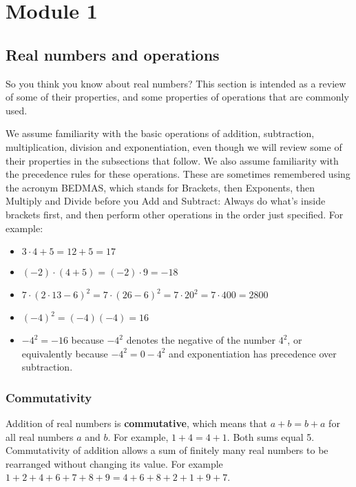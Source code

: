 \documentclass[11pt]{book}               %
\begin{document}
\setcounter{section}{0}

\setcounter{tocdepth}{1}

\tableofcontents
\newpage

\chapter{Module 1}

\section{Real numbers and operations}


So you think you know about real numbers?  This section is intended as a review of some of their properties, and
some properties of operations that are commonly used.

We assume familiarity with the basic operations of addition, subtraction, multiplication, division and exponentiation,
even though we will review some of their properties in the subsections that follow.  
We also assume familiarity with the precedence rules for these operations.
These are sometimes remembered using the acronym BEDMAS, which stands for
Brackets, then Exponents, then Multiply and Divide before you Add and Subtract:
Always do what's inside brackets first, and then perform other operations in the order just specified.
For example:
\begin{itemize}
\item $3 \cdot 4 + 5 = 12 + 5 = 17$
\item $(-2) \cdot (4 + 5) = (-2) \cdot 9 = -18$
\item $7 \cdot (2 \cdot 13 - 6)^2 = 7 \cdot (26 - 6)^2 = 7 \cdot 20^2 = 7 \cdot 400 = 2800$
\item $(-4)^2 = (-4)(-4) = 16$
\item $-4^2 = -16$ because $-4^2$ denotes the negative of the number $4^2$, or equivalently 
because $-4^2 = 0-4^2$ and exponentiation has precedence over subtraction.
\end{itemize}



\subsection{Commutativity} 

Addition of real numbers is \textbf{commutative}, which means that $a + b = b + a$ for all real numbers $a$ and $b$.  
For example, $1+4 = 4+1$.  Both sums equal 5.
Commutativity of addition allows a sum of finitely many real numbers to be rearranged without changing its value.
For example $1 + 2 + 4 + 6 + 7 + 8 + 9 = 4 + 6 + 8 + 2 + 1 + 9 + 7$.
\end{document}
